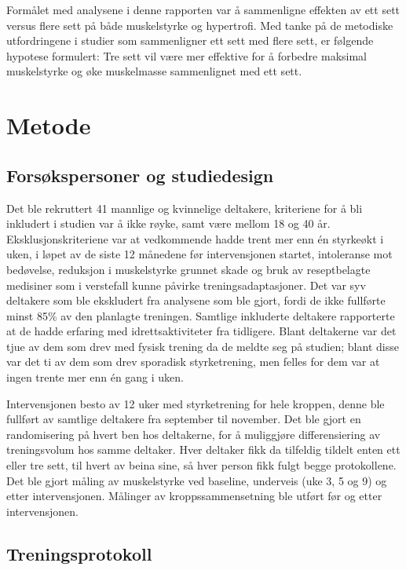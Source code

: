 \documentclass[
  letterpaper,
  DIV=11,
  numbers=noendperiod]{scrreprt}
\begin{document}
Formålet med analysene i denne rapporten var å sammenligne effekten av
ett sett versus flere sett på både muskelstyrke og hypertrofi. Med tanke
på de metodiske utfordringene i studier som sammenligner ett sett med
flere sett, er følgende hypotese formulert: Tre sett vil være mer
effektive for å forbedre maksimal muskelstyrke og øke muskelmasse
sammenlignet med ett sett.

\section{Metode}\label{metode-5}

\subsection{Forsøkspersoner og
studiedesign}\label{forsuxf8kspersoner-og-studiedesign}

Det ble rekruttert 41 mannlige og kvinnelige deltakere, kriteriene for å
bli inkludert i studien var å ikke røyke, samt være mellom 18 og 40 år.
Eksklusjonskriteriene var at vedkommende hadde trent mer enn én
styrkeøkt i uken, i løpet av de siste 12 månedene før intervensjonen
startet, intoleranse mot bedøvelse, reduksjon i muskelstyrke grunnet
skade og bruk av reseptbelagte medisiner som i verstefall kunne påvirke
treningsadaptasjoner. Det var syv deltakere som ble ekskludert fra
analysene som ble gjort, fordi de ikke fullførte minst 85\% av den
planlagte treningen. Samtlige inkluderte deltakere rapporterte at de
hadde erfaring med idrettsaktiviteter fra tidligere. Blant deltakerne
var det tjue av dem som drev med fysisk trening da de meldte seg på
studien; blant disse var det ti av dem som drev sporadisk styrketrening,
men felles for dem var at ingen trente mer enn én gang i uken.

Intervensjonen besto av 12 uker med styrketrening for hele kroppen,
denne ble fullført av samtlige deltakere fra september til november. Det
ble gjort en randomisering på hvert ben hos deltakerne, for å muliggjøre
differensiering av treningsvolum hos samme deltaker. Hver deltaker fikk
da tilfeldig tildelt enten ett eller tre sett, til hvert av beina sine,
så hver person fikk fulgt begge protokollene. Det ble gjort måling av
muskelstyrke ved baseline, underveis (uke 3, 5 og 9) og etter
intervensjonen. Målinger av kroppssammensetning ble utført før og etter
intervensjonen.

\subsection{Treningsprotokoll}\label{treningsprotokoll}
\end{document}
